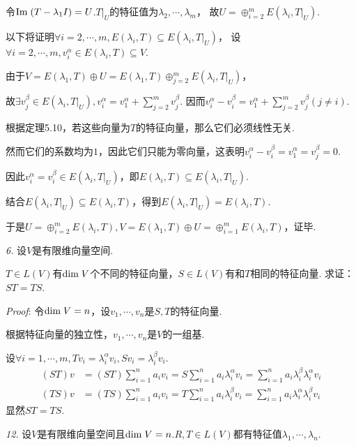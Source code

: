 令\(\mathrm{Im \;}(T-\lambda_1 I)=U\).\(T|_U\)的特征值为\(\lambda_2,\cdots,\lambda_m\)，
故\(U=\oplus_{i=2}^m E(\lambda_i,T|_U)\).

以下将证明\(\forall i=2,\cdots,m,E(\lambda_i,T) \subseteq E(\lambda_i,T|_U)\)，
设\(\forall i=2,\cdots,m,v_i^\alpha \in E(\lambda_i,T) \subseteq V\).

由于\(V=E(\lambda_1,T) \oplus U=E(\lambda_1,T) \oplus_{j=2}^m E(\lambda_i,T|_U)\)，

故\(\exists v_j^\beta \in E(\lambda_i,T|_U),v_i^\alpha=v_1^\alpha+\sum_{j=2}^m v_j^\beta\).
因而\(v_i^\alpha-v_i^\beta=v_1^\alpha+\sum_{j=2}^m v_j^\beta(j \ne i)\).

根据定理5.10，若这些向量为\(T\)的特征向量，那么它们必须线性无关.

然而它们的系数均为\(1\)，因此它们只能为零向量，这表明\(v_i^\alpha-v_i^\beta=v_1^\alpha=v_j^\beta=0\).

因此\(v_i^\alpha=v_i^\beta \in E(\lambda_i,T|_U)\)，即\(E(\lambda_i,T) \subseteq E(\lambda_i,T|_U)\).

结合\(E(\lambda_i,T|_U) \subseteq E(\lambda_i,T)\)，得到\(E(\lambda_i,T|_U)=E(\lambda_i,T)\).

于是\(U=\oplus_{i=2}^m E(\lambda_i,T),V=E(\lambda_1,T) \oplus U=\oplus_{i=1}^m E(\lambda_i,T)\)，证毕.

\newpage

\textit{6.}
设\(V\)是有限维向量空间.

\(T \in L(V)\)有\(\mathrm{dim \;} V\)个不同的特征向量，\(S \in L(V)\)有和\(T\)相同的特征向量.
求证：\(ST=TS\).

\textit{Proof}:
令\(\mathrm{dim \;} V=n\)，设\(v_1,\cdots,v_n\)是\(S,T\)的特征向量.

根据特征向量的独立性，\(v_1,\cdots,v_n\)是\(V\)的一组基.

设\(\forall i=1,\cdots,m,Tv_i=\lambda_i^\alpha v_i,Sv_i=\lambda_i^\beta v_i\).
    \begin{align*}
        (ST)v &=(ST)\sum_{i=1}^n a_iv_i=S\sum_{i=1}^n a_i \lambda_i^\alpha v_i
                =\sum_{i=1}^n a_i \lambda_i^\beta \lambda_i^\alpha v_i \\
        (TS)v &=(TS)\sum_{i=1}^n a_iv_i=T\sum_{i=1}^n a_i \lambda_i^\beta v_i
                =\sum_{i=1}^n a_i \lambda_i^\alpha \lambda_i^\beta v_i
    \end{align*}
显然\(ST=TS\).

\hspace*{\fill}

\textit{12.}
设\(V\)是有限维向量空间且\(\mathrm{dim \;} V=n\).\(R,T \in L(V)\)都有特征值\(\lambda_1,\cdots,\lambda_n\).

